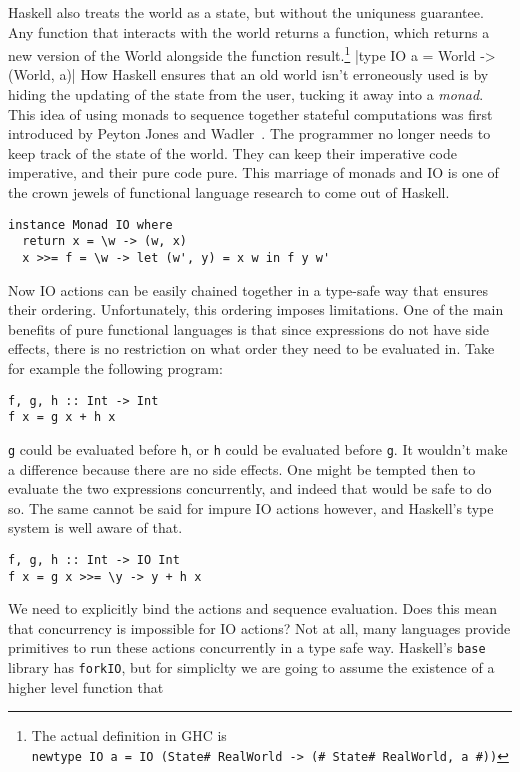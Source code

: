 \documentclass{report}
\begin{document}
Haskell also treats the world as a state, but without the uniquness guarantee.
Any function that interacts with the world returns a function, which returns a
new version of the World alongside the function result.\footnote{The actual
  definition in GHC is \\ \texttt{newtype IO a = IO (State#
    RealWorld -> (# State# RealWorld, a #))}}
|type IO a = World -> (World, a)|
How Haskell ensures that an old world isn't erroneously used is by hiding the
updating of the state from the user, tucking it away into a \textit{monad}. This
idea of using monads to sequence together stateful computations was first
introduced by Peyton Jones and
Wadler~\cite{peytonjones1993}\cite{wadler1995}. The programmer no longer needs
to keep track of the state of the world. They can keep their imperative code
imperative, and their pure code pure. This marriage of monads and IO is one of
the crown jewels of functional language research to come out of Haskell.
\begin{verbatim}
instance Monad IO where
  return x = \w -> (w, x)
  x >>= f = \w -> let (w', y) = x w in f y w'
\end{verbatim}
Now IO actions can be easily chained together in a type-safe way that ensures
their ordering.  Unfortunately, this ordering imposes limitations. One of the
main benefits of pure functional languages is that since expressions do not
have side effects, there is no restriction on what order they need to be
evaluated in.  Take for example the following program:
\begin{verbatim}
f, g, h :: Int -> Int
f x = g x + h x
\end{verbatim}
\texttt{g} could be evaluated before \texttt{h}, or \texttt{h} could be
evaluated before \texttt{g}. It wouldn't make a difference because there are no
side effects. One might be tempted then to evaluate the two expressions
concurrently, and indeed that would be safe to do so.  The same cannot be said
for impure IO actions however, and Haskell's type system is well aware of that.
\begin{verbatim}
f, g, h :: Int -> IO Int
f x = g x >>= \y -> y + h x
\end{verbatim}
We need to explicitly bind the actions and sequence evaluation.  Does this mean
that concurrency is impossible for IO actions? Not at all, many languages
provide primitives to run these actions concurrently in a type safe
way. Haskell's \texttt{base} library has \texttt{forkIO}, but for
simpliclty we are going to assume the existence of a higher level function that
\end{document}
